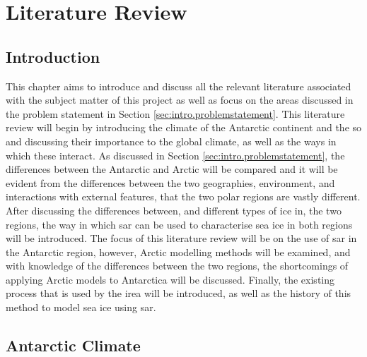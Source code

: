 \chapter{Literature Review}
\label{chap:litReview}
\section*{Introduction} \label{sec:litReview.intro}
This chapter aims to introduce and discuss all the relevant literature associated with the subject matter of this project as well as focus on the areas discussed in the problem statement in Section \ref{sec:intro.problemstatement}. This literature review will begin by introducing the climate of the Antarctic continent and the \ac{so} and discussing their importance to the global climate, as well as the ways in which these interact. As discussed in Section \ref{sec:intro.problemstatement}, the differences between the Antarctic and Arctic will be compared and it will be evident from the differences between the two geographies, environment, and interactions with external features, that the two polar regions are vastly different. After discussing the differences between, and different types of ice in, the two regions, the way in which \ac{sar} can be used to characterise sea ice in both regions will be introduced. The focus of this literature review will be on the use of \acs{sar} in the Antarctic region, however, Arctic modelling methods will be examined, and with knowledge of the differences between the two regions, the shortcomings of applying Arctic models to Antarctica will be discussed. Finally, the existing process that is used by the \ac{irea} will be introduced, as well as the history of this method to model sea ice using \acs{sar}.
\section{Antarctic Climate} \label{sec:litReview.antarcticClimate}

